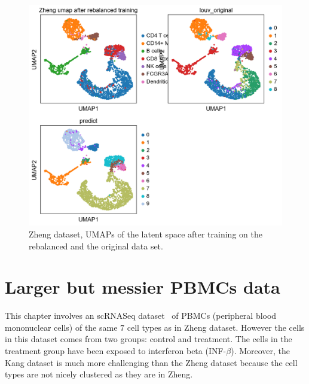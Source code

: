 \documentclass[11pt, a4paper]{report}
\theoremstyle{plain}
\theoremstyle{definition}
\theoremstyle{remark}
\newcommand{\gmvae}{c$\ast$GM$\mathrm{\Delta}$V\AE~}
\begin{document}
\begin{figure}[h]
\centering
\includegraphics[width=1.1\textwidth]{images/gmmvae_zheng_us_balanced_10c_umap1.png}
\caption{Zheng dataset, UMAPs of the latent space after training 
on the rebalanced and the original data set.
}
\label{fig:zheng_ss_latent_balanced}
\end{figure}



\chapter{Larger but messier PBMCs data}
This chapter involves an scRNASeq dataset~\cite{kang2018multiplexed} of PBMCs
(peripheral blood mononuclear cells) of the same $7$ cell types as in Zheng
dataset.
However the cells in this dataset comes from two groups:
control and treatment. The cells in the treatment group have been exposed to
interferon beta (INF-$\beta$).
Moreover,
the Kang dataset is much more challenging than the Zheng dataset because the
cell types are not nicely clustered as they are in Zheng.
\end{document}
